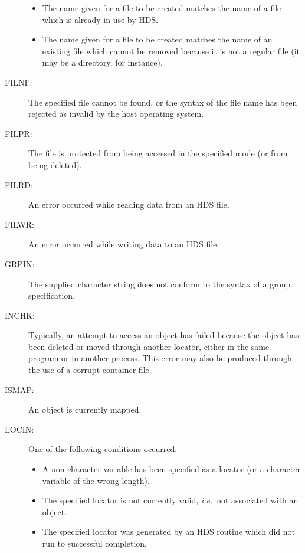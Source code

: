\documentclass[twoside,11pt]{article}
\newcommand{\htmlref}[2]{#1}
\renewcommand{\_}{\texttt{\symbol{95}}}
\newcommand{\st}[1]{{\em{#1}}}
\begin{document}
\begin{description}
\begin{itemize}
\item The name given for a file to be created matches the name of a file which
is already in use by HDS.

\item The name given for a file to be created matches the name of an existing
file which cannot be removed because it is not a regular file (it may be a
directory, for instance).

\end{itemize}

\item [FILNF:]
The specified file cannot be found, or the syntax of the file name has been
rejected as invalid by the host operating system.

\item [FILPR:]
The file is protected from being accessed in the specified mode (or from being
deleted).

\item [FILRD:]
An error occurred while reading data from an HDS file.

\item [FILWR:]
An error occurred while writing data to an HDS file.

\item [GRPIN:]
The supplied character string does not conform to the syntax of a \htmlref{group}{sect:group}
specification.

\item [INCHK:]
Typically, an attempt to access an object has failed because the object has
been deleted or moved through another \htmlref{locator}{sect:locators}, either in the same program or in
another process. This error may also be produced through the use of a corrupt
container file.

\item [ISMAP:]
An object is currently mapped.

\item [LOCIN:]
One of the following conditions occurred:

\begin{itemize}
\item A non-character variable has been specified as a \htmlref{locator}{sect:locators} (or a character
variable of the wrong length).

\item The specified \htmlref{locator}{sect:locators} is not currently valid, \st{i.e.}\ not associated
with an object.

\item The specified \htmlref{locator}{sect:locators} was generated by an HDS routine which did not run
to successful completion.


\end{itemize}
\end{description}
\end{document}
